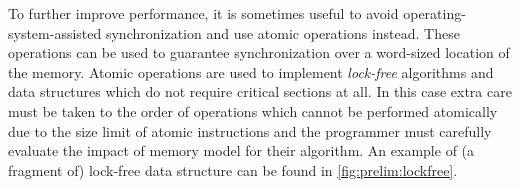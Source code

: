 To further improve performance, it is sometimes useful to avoid
operating-system-assisted synchronization and use atomic operations instead.
These operations can be used to guarantee synchronization over a word-sized
location of the memory.
Atomic operations are used to implement \emph{lock-free} algorithms and data
structures which do not require critical sections at all.
In this case extra care must be taken to the order of operations which cannot
be performed atomically due to the size limit of atomic instructions and the
programmer must carefully evaluate the impact of memory model for their
algorithm.
An example of (a fragment of) lock-free data structure can be found in \autoref{fig:prelim:lockfree}.

